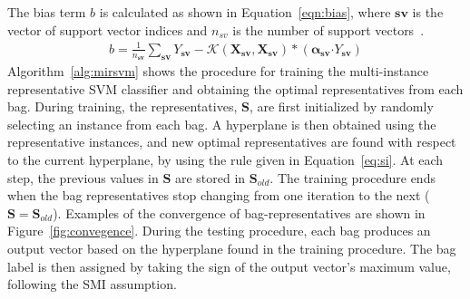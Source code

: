 \documentclass[reqno]{vcuthesis}
\newcommand{\spa}[1]{\mathcal{#1}}
\numberwithin{equation}{chapter}
\begin{document}
The bias term $b$ is calculated as shown in Equation~\eqref{eqn:bias}, where $\bm{sv}$ is the vector of support vector indices and $n_{sv}$ is the number of support vectors~\cite{Huang2006}.
\begin{align}
\label{eqn:bias}
b = \frac{1}{n_{\bm{sv}}}\sum_{\bm{sv}} Y_{\bm{sv}} - \spa{K}(\bm X_{\bm{sv}},\bm X_{\bm{sv}})*(\bm \alpha_{\bm{sv}}\bm\cdot Y_{\bm{sv}})
\end{align}
Algorithm~\ref{alg:mirsvm} shows the procedure for training the multi-instance representative SVM classifier and obtaining the optimal representatives from each bag.  During training, the representatives, $\bm S$, are first initialized by randomly selecting an instance from each bag. A hyperplane is then obtained using the representative instances, and new optimal representatives are found with respect to the current hyperplane, by using the rule given in Equation~\eqref{eq:si}. At each step, the previous values in $\bm S$ are stored in $\bm S_{old}$. The training procedure ends when the bag representatives stop changing from one iteration to the next ($\bm S = \bm S_{old}$). Examples of the convergence of bag-representatives are shown in Figure~\ref{fig:convegence}. During the testing procedure, each bag produces an output vector based on the hyperplane found in the training procedure. The bag label is then assigned by taking the sign of the output vector's maximum value, following the SMI assumption. 
\end{document}
